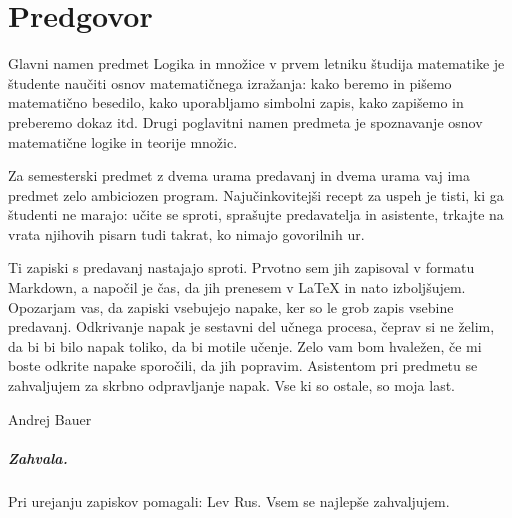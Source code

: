 \chapter{Predgovor}
\label{chap:predgovor}

Glavni namen predmet Logika in množice v prvem letniku študija matematike je študente
naučiti osnov matematičnega izražanja: kako beremo in pišemo matematično besedilo, kako
uporabljamo simbolni zapis, kako zapišemo in preberemo dokaz itd. Drugi poglavitni namen
predmeta je spoznavanje osnov matematične logike in teorije množic.

Za semesterski predmet z dvema urama predavanj in dvema urama vaj ima predmet zelo
ambiciozen program. Najučinkovitejši recept za uspeh je tisti, ki ga študenti ne marajo:
učite se sproti, sprašujte predavatelja in asistente, trkajte na vrata njihovih pisarn
tudi takrat, ko nimajo govorilnih ur.

Ti zapiski s predavanj nastajajo sproti. Prvotno sem jih zapisoval v formatu Markdown, a napočil je čas, da jih prenesem v {\LaTeX} in nato izboljšujem. Opozarjam vas, da zapiski vsebujejo napake, ker so le grob zapis vsebine predavanj. Odkrivanje napak je sestavni del učnega procesa, čeprav si ne želim, da bi bi bilo napak toliko, da bi motile učenje. Zelo vam bom hvaležen, če mi boste odkrite napake sporočili, da jih popravim. Asistentom pri predmetu se zahvaljujem za skrbno odpravljanje napak. Vse ki so ostale, so moja last.

\bigskip

\begin{flushright}
Andrej Bauer \qquad\hbox{}
\end{flushright}

\bigskip

\paragraph{Zahvala.}
%
Pri urejanju zapiskov pomagali:
%
Lev Rus.
%
Vsem se najlepše zahvaljujem.


